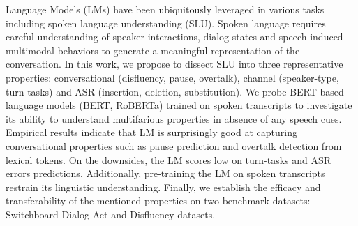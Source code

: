 Language Models (LMs) have been ubiquitously leveraged in various tasks including spoken language understanding (SLU). Spoken language requires careful understanding of speaker interactions, dialog states and speech induced multimodal behaviors to generate a meaningful representation of the conversation. In this work, we propose to dissect SLU into three representative properties: conversational (disfluency, pause, overtalk), channel (speaker-type, turn-tasks) and ASR (insertion, deletion, substitution).  We probe BERT based language models (BERT, RoBERTa) trained on spoken transcripts to investigate its ability to understand multifarious properties in absence of any speech cues. Empirical results indicate that LM is surprisingly good at capturing conversational properties such as pause prediction and overtalk detection from lexical tokens. On the downsides, the LM scores low on turn-tasks and ASR errors predictions. Additionally, pre-training the LM on spoken transcripts restrain its linguistic understanding. Finally, we establish the efficacy and transferability of the mentioned properties on two benchmark datasets: Switchboard Dialog Act and Disfluency datasets.
